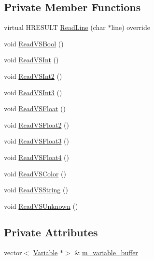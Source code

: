 \subsection*{Private Member Functions}
\begin{DoxyCompactItemize}
\item 
virtual H\+R\+E\+S\+U\+LT \hyperlink{classmage_1_1_v_s_reader_a63c6f6fa8ddb0f6a001e3969c5b19c1f}{Read\+Line} (char $\ast$line) override
\item 
void \hyperlink{classmage_1_1_v_s_reader_a579233b81762c064739a29ba1c140898}{Read\+V\+S\+Bool} ()
\item 
void \hyperlink{classmage_1_1_v_s_reader_abbb6176a73ebddd88fc3ed58c89aa01a}{Read\+V\+S\+Int} ()
\item 
void \hyperlink{classmage_1_1_v_s_reader_a4a3b90b47cb5e262a72df719674b9d93}{Read\+V\+S\+Int2} ()
\item 
void \hyperlink{classmage_1_1_v_s_reader_a6fa8fa2cbb66a9a1872bb84a0612a32d}{Read\+V\+S\+Int3} ()
\item 
void \hyperlink{classmage_1_1_v_s_reader_a64c525d3d87ed248424e4eba359d9ecf}{Read\+V\+S\+Float} ()
\item 
void \hyperlink{classmage_1_1_v_s_reader_a18c7821c219354d84f0071a5bfa8651c}{Read\+V\+S\+Float2} ()
\item 
void \hyperlink{classmage_1_1_v_s_reader_a63d8c0cb3108d8aa0f582a59b44db6ac}{Read\+V\+S\+Float3} ()
\item 
void \hyperlink{classmage_1_1_v_s_reader_aa1230cf0d6305f98172aabeacbfef8e0}{Read\+V\+S\+Float4} ()
\item 
void \hyperlink{classmage_1_1_v_s_reader_a42bdfc1fcc6f385e0f88820491d53e04}{Read\+V\+S\+Color} ()
\item 
void \hyperlink{classmage_1_1_v_s_reader_a8d00057f90b2a2ed2e84e47530f91227}{Read\+V\+S\+String} ()
\item 
void \hyperlink{classmage_1_1_v_s_reader_aaa63e49901b2ef9e5903aff0e13ec4b0}{Read\+V\+S\+Unknown} ()
\end{DoxyCompactItemize}
\subsection*{Private Attributes}
\begin{DoxyCompactItemize}
\item 
vector$<$ \hyperlink{structmage_1_1_variable}{Variable} $\ast$$>$ \& \hyperlink{classmage_1_1_v_s_reader_a32ffea034d4540dd90156452a9d78e52}{m\+\_\+variable\+\_\+buffer}
\end{DoxyCompactItemize}
